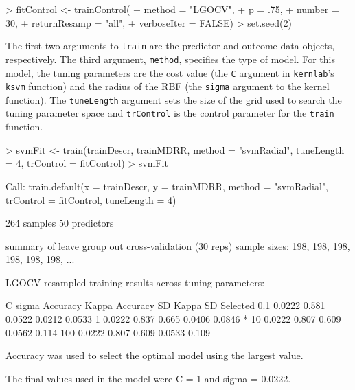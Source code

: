 \documentclass[12pt]{article}
\begin{document}
\begin{small}
\begin{Schunk}
\begin{Sinput}
> fitControl <- trainControl(
+                            method = "LGOCV",
+                            p = .75,
+                            number = 30,
+                            returnResamp = "all",
+                            verboseIter = FALSE)
> set.seed(2)
\end{Sinput}
\end{Schunk}
\end{small}


The first two arguments to \texttt{train} are the predictor and outcome data objects, respectively. The third argument, \texttt{method}, specifies the type of model. For this model, the tuning parameters are the cost value (the \texttt{C} argument in \texttt{kernlab}'s \texttt{ksvm} function) and the radius of the RBF (the \texttt{sigma} argument to the kernel function). The \texttt{tuneLength} argument sets the size of the grid used to search the tuning parameter space and \texttt{trControl} is the control parameter for the \texttt{train} function. 

\begin{small}
\begin{Schunk}
\begin{Sinput}
> svmFit <- train(trainDescr, trainMDRR, method = "svmRadial", tuneLength = 4, trControl = fitControl)
> svmFit
\end{Sinput}
\begin{Soutput}
Call:
train.default(x = trainDescr, y = trainMDRR, method = "svmRadial", 
    trControl = fitControl, tuneLength = 4)

264 samples
50 predictors

summary of leave group out cross-validation (30 reps) sample sizes:
    198, 198, 198, 198, 198, 198, ... 

LGOCV resampled training results across tuning parameters:

  C    sigma   Accuracy  Kappa   Accuracy SD  Kappa SD  Selected
  0.1  0.0222  0.581     0.0522  0.0212       0.0533            
  1    0.0222  0.837     0.665   0.0406       0.0846    *       
  10   0.0222  0.807     0.609   0.0562       0.114             
  100  0.0222  0.807     0.609   0.0533       0.109             

Accuracy was used to select the optimal model using the largest value.

The final values used in the model were C = 1 and sigma = 0.0222.
\end{Soutput}
\end{Schunk}
\end{small}
\end{document}

